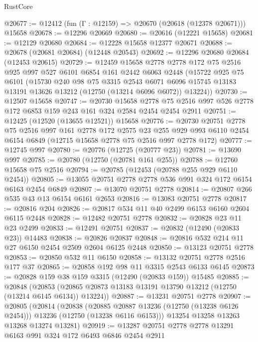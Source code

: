 \begin{lexlean}{RustCore}
\begin{coremodule}
@20677 := @12412 (fun (Γ : @12159) => @20670 (@20618 (@12378 @20671))) @15658
@20678 := @12296 @20669
@20680 := @20616 (@12221 @15658)
@20681 := @12129 @20680
@20684 := @12228 @15658 @12377 @20671
@20688 := @20678 (@20681 @20684) (@12448 @20543)
@20692 := @12296 @20680 @20684 (@12453 @20615)
@20729 := @12459
    @15658
    @2778
    @2778
    @172
    @75
    @2516
    @925
    @997
    @527
    @6101
    @6854
    @161
    @2442
    @6063
    @2448
    (@15722
      @925
      @75
      @6101
      (@15730
        @240
        @98
        @75
        @3315
        @2543
        @6071
        @6096
        @15745
        @13183
        @13191
        @13626
        @13212
        (@12750 (@13214 @6096 @6072))
        @13224))
@20730 := @12507 @15658
@20747 := @20730
    @15658
    @2778
    @75
    @2516
    @997
    @526
    @2778
    @172
    @6853
    @159
    @243
    @161
    @324
    @2584
    @2454
    @2454
    @2911
@20751 := @12425 (@12520 (@13655 @12521)) @15658
@20776 := @20730
    @20751
    @2778
    @75
    @2516
    @997
    @161
    @2778
    @172
    @2575
    @23
    @255
    @929
    @993
    @6110
    @2454
    @6154
    @6849
    (@12715 @15658 @2778 @75 @2516 @997 @2778 @172)
@20777 := @12745 @997
@20780 := @20776 (@12725 (@20777 @23))
@20781 := @13690 @997
@20785 := @20780 (@12750 (@20781 @161 @255))
@20788 := @12760 @15658 @75 @2516
@20794 := @20785 (@12453 (@20788 @255 @929 @6110 @2454))
@20805 := @13055 @20751 @2778 @2778 @536 @991 @324 @172 @6154 @6163 @2454 @6849
@20807 := @13070 @20751 @2778
@20814 := @20807 @266 @535 @43 @13 @6154 @6161 @2653
@20816 := @13083 @20751 @2778
@20817 := @20816 @204
@20826 := @20817 @534 @11 @40 @2499 @6153 @6160 @2604 @6115 @2448
@20828 := @12482 @20751 @2778
@20832 := @20828 @23 @11 @23 @2499
@20833 := @12491 @20751
@20837 := @20832 (@12490 (@20833 @23)) @14483
@20838 := @20826 @20837
@20848 := @20816 @532 @214 @11 @27 @6150 @2454 @2509 @2604 @6125 @2448
@20850 := @13123 @20751 @2778
@20853 := @20850 @532 @11 @6150
@20858 := @13132 @20751 @2778 @2516 @177 @37
@20865 := @20858 @192 @98 @11 @3315 @2543 @6133 @6145
@20873 := @20828 @159 @38 @159 @3315 (@12490 (@20833 @159)) @15485
@20885 := @20848
    (@20853 (@20865 @20873 @13183 @13191 @13790 @13212 (@12750 (@13214 @6145 @6134)) @13224))
@20887 := @13231 @20751 @2778
@20907 := @20805
    (@20814
      (@20838
        (@20885 @20887 @13236 (@12750 (@13238 @6126 @2454)))
        @13236
        (@12750 (@13238 @6116 @6153)))
      @13254
      @13258
      @13263
      @13268
      @13274
      @13281)
@20919 := @13287 @20751 @2778 @2778 @13291 @6163 @991 @324 @172 @6493 @6846 @2454 @2911

\end{coremodule}
\end{lexlean}
